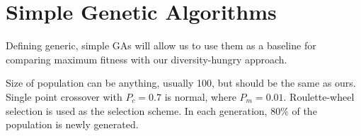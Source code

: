 \section{Simple Genetic Algorithms}
Defining generic, simple GAs will allow us to use them as a baseline for comparing maximum fitness with our diversity-hungry approach.

Size of population can be anything, usually 100, but should be the same as ours. Single point crossover with $P_c = 0.7$ is normal, where $P_m = 0.01$. Roulette-wheel selection is used as the selection scheme. In each generation, $80\%$ of the population is newly generated.

